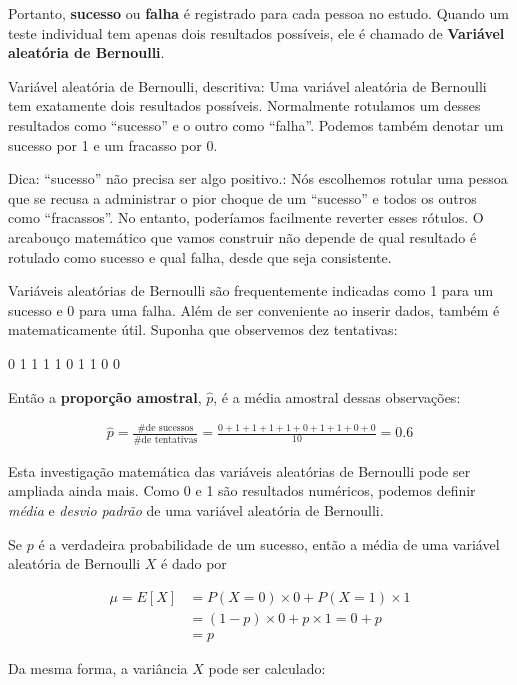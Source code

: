 \documentclass[
]{book}
\theoremstyle{definition}
\theoremstyle{definition}
\theoremstyle{definition}
\theoremstyle{definition}
\theoremstyle{remark}
\begin{document}
Portanto, \textbf{sucesso} ou \textbf{falha} é registrado para cada pessoa no estudo. Quando um teste individual tem apenas dois resultados possíveis, ele é chamado de \textbf{Variável aleatória de Bernoulli}.

Variável aleatória de Bernoulli, descritiva: Uma variável aleatória de Bernoulli tem exatamente dois resultados possíveis. Normalmente rotulamos um desses resultados como ``sucesso'' e o outro como ``falha''. Podemos também denotar um sucesso por 1 e um fracasso por 0.

Dica: ``sucesso'' não precisa ser algo positivo.: Nós escolhemos rotular uma pessoa que se recusa a administrar o pior choque de um ``sucesso'' e todos os outros como ``fracassos''. No entanto, poderíamos facilmente reverter esses rótulos. O arcabouço matemático que vamos construir não depende de qual resultado é rotulado como sucesso e qual falha, desde que seja consistente.

Variáveis aleatórias de Bernoulli são frequentemente indicadas como 1 para um sucesso e 0 para uma falha. Além de ser conveniente ao inserir dados, também é matematicamente útil. Suponha que observemos dez tentativas:

\begin{center}
0 1 1 1 1 0 1 1 0 0
\end{center}

Então a \textbf{proporção amostral}, \(\hat{p}\), é a média amostral dessas observações:

\begin{eqnarray*}
\hat{p} = \frac{\text{\# de sucessos}}{\text{\# de tentativas}} = \frac{0+1+1+1+1+0+1+1+0+0}{10} = 0.6
\end{eqnarray*}

Esta investigação matemática das variáveis aleatórias de Bernoulli pode ser ampliada ainda mais. Como 0 e 1 são resultados numéricos, podemos definir \emph{média} e \emph{desvio padrão} de uma variável aleatória de Bernoulli.

Se \({p}\) é a verdadeira probabilidade de um sucesso, então a média de uma variável aleatória de Bernoulli \(X\) é dado por

\begin{align*}
\mu = E[X] &= P(X=0)\times0 + P(X=1)\times1 \\
    &= (1-p)\times0 + p\times 1 = 0+p \\
    &= p
\end{align*}

Da mesma forma, a variância \(X\) pode ser calculado:
\end{document}
